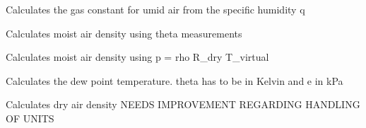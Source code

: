 \documentclass[a4paper,10pt,english]{sphinxmanual}
\begin{document}

\begin{fulllineitems}
\label{pymicra:pymicra.physics.R_moistAir}
Calculates the gas constant for umid air from the specific humidity q

\end{fulllineitems}


\begin{fulllineitems}
\label{pymicra:pymicra.physics.airDensity_from_theta}
Calculates moist air density using theta measurements

\end{fulllineitems}


\begin{fulllineitems}
\label{pymicra:pymicra.physics.airDensity_from_theta_v}
Calculates moist air density using p = rho R\_dry T\_virtual

\end{fulllineitems}


\begin{fulllineitems}
\label{pymicra:pymicra.physics.dewPointTemp}
Calculates the dew point temperature.
theta has to be in Kelvin and e in kPa

\end{fulllineitems}


\begin{fulllineitems}
\label{pymicra:pymicra.physics.dryAirDensity_from_p}
Calculates dry air density
NEEDS IMPROVEMENT REGARDING HANDLING OF UNITS

\end{fulllineitems}
\end{document}
